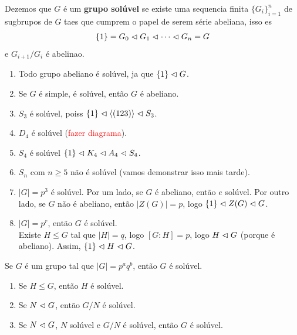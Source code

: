 \begin{definition}
  Dezemos que $G$ é um \textbf{grupo solúvel} se existe uma sequencia finita $\{G_i\}_{i=1}^{n}$ de sugbrupos de $G$ taes que cumprem o papel de serem série abeliana, isso es
  \begin{align*}
    \{1\}=G_0\vartriangleleft G_1\vartriangleleft \cdots\vartriangleleft G_n=G
  \end{align*}
  e $G_{i+1}/G_{i}$ é abelinao. 
\end{definition}
\begin{example}
  \begin{enumerate}
    \item Todo grupo abeliano é solúvel, ja que $\{1\}\vartriangleleft G$.
    \item Se $G$ é simple, é solúvel, então $G$ é abeliano.
    \item $S_3$ é solúvel, poiss $\{1\}\vartriangleleft \left\langle (123) \right\rangle\vartriangleleft S_3$.
    \item $D_4$ é solúvel (\textcolor{red}{fazer diagrama}).
    \item $S_4$ é solúvel $\{1\}\vartriangleleft K_4\vartriangleleft A_4\vartriangleleft S_4$.
    \item $S_n$ com $n\geq 5$ não é solúvel (vamos demonstrar isso mais tarde).
    \item $|G|=p^{3}$ é solúvel. Por um lado, se $G$ é abeliano, então $e$ solúvel. Por outro lado, se $G$ não é abeliano, então $|Z(G)|=p$, logo $\{1\}\vartriangleleft Z(G)\vartriangleleft G$.
    \item $|G|=p^{r}$, então $G$ é solúvel.\\
      Existe $H\leq G$ tal que $|H|=q$, logo $[G:H]=p$, logo $H\vartriangleleft G$ (porque é abeliano). Assim, $\{1\}\vartriangleleft H\vartriangleleft G$. 
  \end{enumerate}
\end{example}
\begin{theorem}
  Se $G$ é um grupo tal que $|G|=p^{a}q^{b}$, então $G$ é solúvel. 
\end{theorem}
\begin{proposition}
  \begin{enumerate}
    \item Se $H\leq G$, então $H$ é solúvel.
    \item Se $N\vartriangleleft G$, então $G/N$ é solúvel.
    \item Se $N\vartriangleleft G$, $N$ solúvel e $G/N$ é solúvel, então $G$ é solúvel. 
  \end{enumerate}
\end{proposition}
